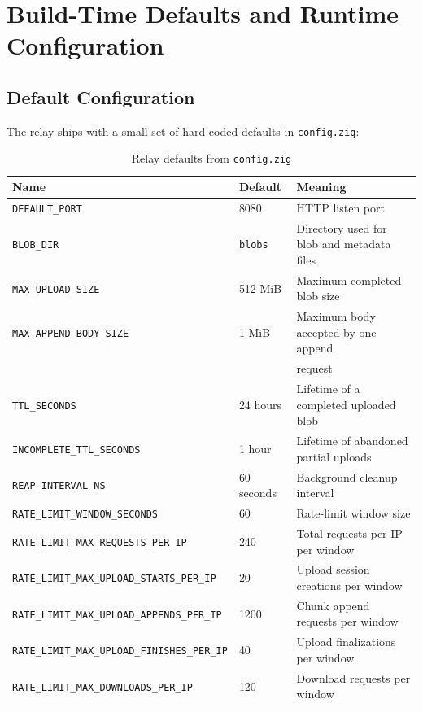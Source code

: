 \documentclass[11pt,a4paper]{report}
\begin{document}
\chapter{Build-Time Defaults and Runtime Configuration}

\section{Default Configuration}

The relay ships with a small set of hard-coded defaults in \texttt{config.zig}:

\begin{table}[H]
\centering
\begin{tabular}{lll}
\toprule
\textbf{Name} & \textbf{Default} & \textbf{Meaning} \\
\midrule
\texttt{DEFAULT\_PORT} & 8080 & HTTP listen port \\
\texttt{BLOB\_DIR} & \texttt{blobs} & Directory used for blob and metadata files \\
\texttt{MAX\_UPLOAD\_SIZE} & 512 MiB & Maximum completed blob size \\
\texttt{MAX\_APPEND\_BODY\_SIZE} & 1 MiB & Maximum body accepted by one append \\
\texttt{} & & request \\
\texttt{TTL\_SECONDS} & 24 hours & Lifetime of a completed uploaded blob \\
\texttt{INCOMPLETE\_TTL\_SECONDS} & 1 hour & Lifetime of abandoned partial uploads \\
\texttt{REAP\_INTERVAL\_NS} & 60 seconds & Background cleanup interval \\
\texttt{RATE\_LIMIT\_WINDOW\_SECONDS} & 60 & Rate-limit window size \\
\texttt{RATE\_LIMIT\_MAX\_REQUESTS\_PER\_IP} & 240 & Total requests per IP per window \\
\texttt{RATE\_LIMIT\_MAX\_UPLOAD\_STARTS\_PER\_IP} & 20 & Upload session creations per window \\
\texttt{RATE\_LIMIT\_MAX\_UPLOAD\_APPENDS\_PER\_IP} & 1200 & Chunk append requests per window \\
\texttt{RATE\_LIMIT\_MAX\_UPLOAD\_FINISHES\_PER\_IP} & 40 & Upload finalizations per window \\
\texttt{RATE\_LIMIT\_MAX\_DOWNLOADS\_PER\_IP} & 120 & Download requests per window \\
\bottomrule
\end{tabular}
\caption{Relay defaults from \texttt{config.zig}}
\end{table}
\end{document}
